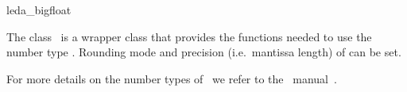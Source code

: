 \ccDefGlobalScope{}
\begin{ccRefClass}{leda_bigfloat}

\ccDefinition

The class \ccRefName\  is a wrapper class that provides the functions 
needed to use the number type .  
Rounding mode and precision (i.e.\ mantissa length) of 
 can be set. 

For more details on the number types of \leda\ we refer to the \leda\
manual~\cite{cgal:mnsu-lum}.


\ccIsModel
{}\\
\\

\end{ccRefClass}
